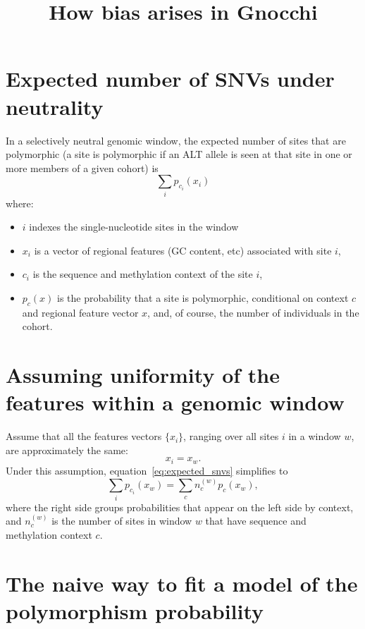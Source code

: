 \documentclass{article}
\title{How bias arises in Gnocchi}
\begin{document}
\maketitle

\section{Expected number of SNVs under neutrality}
In a selectively neutral genomic window,
the expected number of sites that are polymorphic 
(a site is polymorphic if an ALT allele is seen 
at that site in one or more members of a given cohort)
is
\begin{equation}
    \sum_{i} p_{c_i}(x_i)
    \label{eq:expected_snvs}
\end{equation}
where:
\begin{itemize}
    \item $i$ indexes the single-nucleotide sites in the window
    \item $x_i$ is a vector of regional features (GC content, etc)
    associated with site $i$,
    \item $c_i$ is the sequence and methylation context of the site $i$,
    \item $p_c(x)$ is the probability that a site is polymorphic,
    conditional on context $c$ and regional feature vector $x$,
    and, of course, the number of individuals in the cohort.
\end{itemize}

\section{Assuming uniformity of the features within a genomic window}

Assume that all the features vectors $\{x_i\}$, ranging over all sites $i$ in a window $w$,
are approximately the same: 
\[ x_i = x_w. \]
Under this assumption, equation~\eqref{eq:expected_snvs} simplifies to
\begin{equation}
\sum_{i} p_{c_i}(x_w) = \sum_c n_c^{(w)} p_c(x_w),
\end{equation}
where the right side groups probabilities that appear on the left side by 
context, and $n_c^{(w)}$ is the number of sites in window $w$ that have 
sequence and methylation context $c$. 

\section{The naive way to fit a model of the polymorphism probability}
\end{document}
